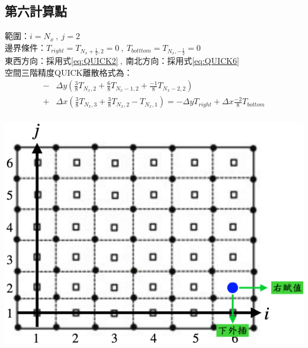 \documentclass[12pt]{article}
\begin{document}
\subsection{第六計算點}
 \begin{minipage}{0.6\textwidth}
   \noindent 範圍：$i=N_{x}\ ,\ j=2$\\[1.5ex]
   \noindent 邊界條件：$T_{right} = T_{N_{x}+\frac{1}{2},2}= 0\ ,\ T_{botttom} = T_{N_{x},-\frac{1}{2}}= 0$\\[1.5ex]
   \noindent 東西方向：採用式\eqref{eq:QUICK2}$\ ,\ $南北方向：採用式\eqref{eq:QUICK6}\\[1.5ex]
   \noindent 空間三階精度QUICK離散格式為：
   \begin{equation*}\begin{split}
   - &\Delta y(\frac{3}{8}T_{N_{x},2} + \frac{6}{8}T_{N_{x}-1,2} + \frac{-1}{8}T_{N_{x}-2,2}) \\[1.5ex] 
   + &\Delta x(\frac{3}{8}T_{N_{x},3} + \frac{3}{8}T_{N_{x},2} - T_{N_{x},1}) =  -\Delta y T_{right}+\Delta x\frac{-2}{8}T_{bottom} \\[1.5ex]
   \end{split}\end{equation*}
   \end{minipage}%
   \hfill
   \begin{minipage}{0.34\textwidth}
   \centering
   \includegraphics[width=\linewidth,height=9\baselineskip]{25.png}
   \label{fig:6th point}
\end{minipage}
\end{document}
